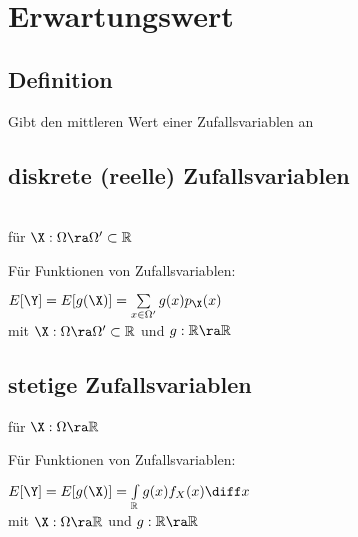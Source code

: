 \documentclass[german,color,6pt]{latex4ei/latex4ei_sheet}
\begin{document}
\vfill 
\section{Erwartungswert}
\begin{sectionbox}
	\subsection{Definition}
	Gibt den mittleren Wert einer Zufallsvariablen an
\end{sectionbox}

\begin{sectionbox}
	\subsection{diskrete (reelle) Zufallsvariablen}
	 \\
	für $\X: \Omega \ra \Omega' \subset \mathbb R$ 
	
	Für Funktionen von Zufallsvariablen:
	
	$E[\Y] = E[g(\X)] = \sum \limits_{x \in \Omega'} g(x) p_{\X} (x)$\\
	mit $\X : \Omega \ra \Omega' \subset \mathbb R$ und $g: \mathbb R \ra \mathbb R$
\end{sectionbox}

\begin{sectionbox}
	\subsection{stetige Zufallsvariablen}
	 für $\X : \Omega \ra \mathbb R$
	
	Für Funktionen von Zufallsvariablen:
	
	$E[\Y] = E[g(\X)] = \int \limits_{\mathbb R} g(x) f_X (x) \diff x$\\
	mit $\X : \Omega \ra \mathbb R $ und $g: \mathbb R \ra \mathbb R$
\end{sectionbox}
\end{document}
